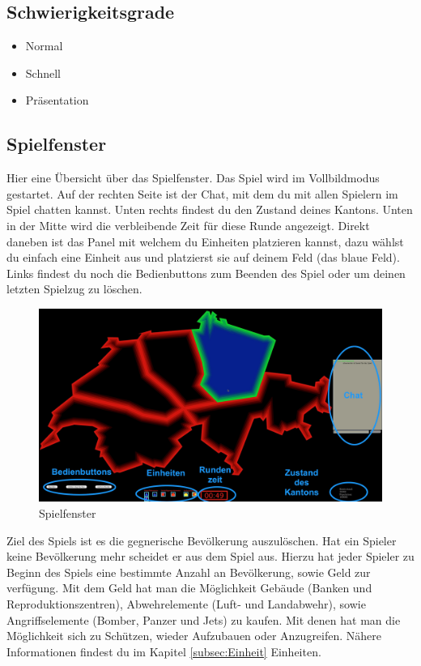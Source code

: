 \documentclass[ngerman, 12pt, pdftex]{scrartcl}[2006/07/30]
\begin{document}
\subsection{Schwierigkeitsgrade}
\begin{itemize}
\item Normal 
\item Schnell
\item Präsentation
\end{itemize}

\subsection{Spielfenster}
Hier eine Übersicht über das Spielfenster. Das Spiel wird im Vollbildmodus gestartet. Auf der rechten Seite ist der Chat, mit dem du mit allen Spielern im Spiel chatten kannst.
Unten rechts findest du den Zustand deines Kantons. Unten in der Mitte wird die verbleibende Zeit für diese Runde angezeigt. 
Direkt daneben ist das Panel mit welchem du Einheiten platzieren kannst, dazu wählst du einfach eine Einheit aus und platzierst sie auf deinem Feld (das blaue Feld).
Links findest du noch die Bedienbuttons zum Beenden des Spiel oder um deinen letzten Spielzug zu löschen.
\begin{figure}[h]
\centering
\includegraphics[scale=0.15]{spiel/spielfenster.jpg}
\caption{Spielfenster}
\end{figure}


Ziel des Spiels ist es die gegnerische Bevölkerung auszulöschen. Hat ein Spieler keine Bevölkerung mehr scheidet er aus dem Spiel aus.
Hierzu hat jeder Spieler zu Beginn des Spiels eine bestimmte Anzahl an Bevölkerung, sowie Geld zur verfügung.
Mit dem Geld hat man die Möglichkeit Gebäude (Banken und Reproduktionszentren), Abwehrelemente (Luft- und Landabwehr), sowie Angriffselemente (Bomber, Panzer und Jets) zu kaufen. Mit denen hat man die Möglichkeit sich zu Schützen, wieder Aufzubauen oder Anzugreifen. Nähere Informationen findest du im Kapitel \ref{subsec:Einheit} Einheiten.
\end{document}
